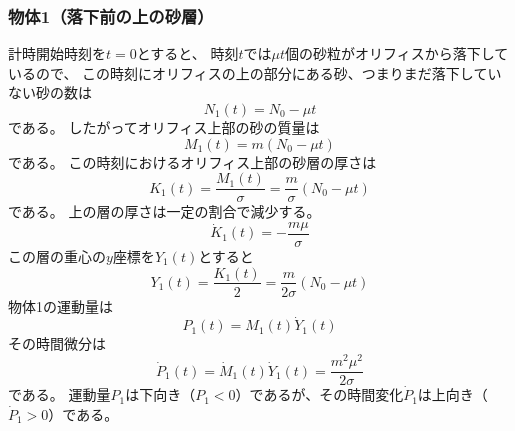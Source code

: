\documentclass[dvipdfmx]{article}
\begin{document}
\subsubsection{物体1（落下前の上の砂層）}
計時開始時刻を$t=0$とすると、
時刻$t$では$\mu t$個の砂粒がオリフィスから落下しているので、
この時刻にオリフィスの上の部分にある砂、つまりまだ落下していない砂の数は
\begin{equation} \label{250703152453} 
   N_1(t) =  N_0 - \mu t
\end{equation}
である。
したがってオリフィス上部の砂の質量は
\begin{equation} \label{250703152655} 
   M_1(t) = m (N_0-\mu t)
\end{equation}
である。
この時刻におけるオリフィス上部の砂層の厚さは
\begin{equation} \label{250703152748} 
   K_1(t) = \frac{M_1(t)}{\sigma} = \frac{m}{\sigma} (N_0-\mu t)
\end{equation}
である。
上の層の厚さは一定の割合で減少する。
\begin{equation} \label{250919084914} 
   \dot{K}_1(t) = -\frac{m\mu}{\sigma}
\end{equation}
この層の重心の$y$座標を$Y_1(t)$とすると
\begin{equation} \label{250703153013} 
   Y_1(t) = \frac{K_1(t)}{2} = \frac{m}{2\sigma} (N_0-\mu t)
\end{equation}
物体1の運動量は
\begin{equation} \label{250917102959} 
   P_1(t)  = M_1(t) \dot{Y}_1(t) 
\end{equation}
その時間微分は
\begin{equation} \label{250919104731} 
   \dot{P}_1(t) = \dot{M}_1(t)\dot{Y}_1(t) = \frac{m^2\mu^2}{2\sigma}
\end{equation}
である。
運動量$P_1$は下向き（$P_1<0$）であるが、その時間変化$\dot{P}_1$は上向き（$\dot{P}_1>0$）である。


\end{document}

